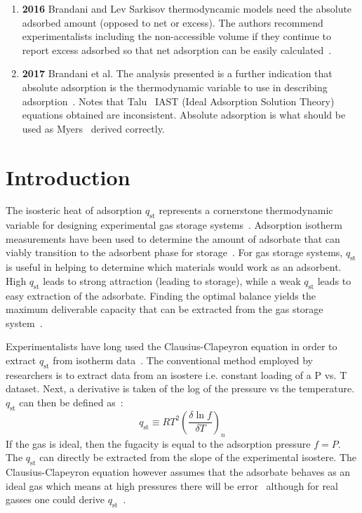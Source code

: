\documentclass[letterpaper,twocolumn,amsmath,amssymb,jcp,aps,10pt]{revtex4-1}
\begin{document}
\begin{enumerate}
\item {\textbf{2016}} Brandani and Lev Sarkisov thermodyncamic models need the absolute adsorbed amount (opposed to net or excess). The authors recommend experimentalists including the non-accessible volume if they continue to report excess adsorbed so that net adsorption can be easily calculated~\cite{brandani2016net}.

\item {\textbf{2017}} Brandani et al. The analysis presented is a further indication that absolute adsorption is the thermodynamic variable to use in describing adsorption~\cite{brandani2017net}. Notes that Talu~\cite{talu2013net} IAST (Ideal Adsorption Solution Theory) equations obtained are
inconsistent.  Absolute adsorption is what should be used as Myers~\cite{myers2014physical} derived correctly.
\end{enumerate}



\section{Introduction}
The isosteric heat of adsorption $q_\text{st}$ represents a cornerstone thermodynamic variable for
designing
experimental gas storage systems~\cite{rudzinski2012adsorption, sturluson2019role, patil2016noria, banerjee2016metal}. Adsorption isotherm measurements have been used to
determine the amount of adsorbate that can viably transition to the adsorbent phase for storage~\cite{matranga1992storage, mulfort2007chemical}. For gas storage systems, $q_\text{st}$
is useful in helping to determine which materials would work as an adsorbent. High $q_\text{st}$ leads to strong
attraction (leading to storage), while a weak $q_\text{st}$ leads to easy extraction of the
adsorbate. Finding the optimal balance yields the maximum deliverable capacity that can be extracted from
the gas storage system~\cite{song2015nbo, bae2010optimal}.

Experimentalists have long used the Clausius-Clapeyron equation in order to extract $q_\text{st}$ from
isotherm data~\cite{pan1998examination, lee2005gas, geier2013selective}. The conventional method employed by researchers is to extract data from an isostere
i.e. constant loading of a P vs. T dataset.  Next, a derivative is taken of the log of the pressure vs the temperature. $q_\text{st}$ can then be defined as~\cite{yang1997adsorption}:
\begin{equation}
    q_\text{st} \equiv R T^2\left( \frac{\delta \ln f}{\delta T}
    \right)_{n}
    \label{eq:qst-common}
\end{equation}
If the gas is ideal, then the fugacity is equal to the adsorption pressure $f = P$. The $q_\text{st}$ can directly be extracted from the slope of the experimental isostere.
The Clausius-Clapeyron equation however assumes that the adsorbate behaves as an ideal gas which means at
high pressures there will be error~\cite{pan1998examination} although for real gasses one could derive
$q_\text{st}$~\cite{askalany2015derivation}.
\end{document}
